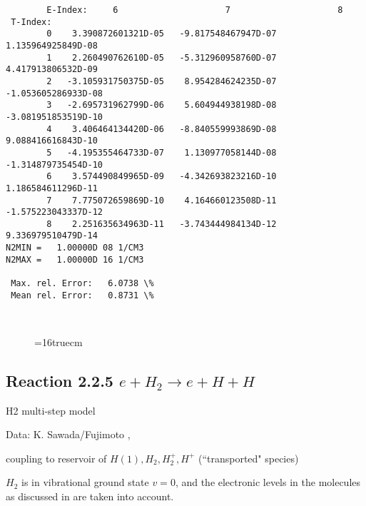 \documentclass[12pt,dvipdfmx]{article}
\begin{document}
\begin{small}
\begin{verbatim}
        E-Index:     6                     7                     8
 T-Index:
        0    3.390872601321D-05   -9.817548467947D-07    1.135964925849D-08
        1    2.260490762610D-05   -5.312960958760D-07    4.417913806532D-09
        2   -3.105931750375D-05    8.954284624235D-07   -1.053605286933D-08
        3   -2.695731962799D-06    5.604944938198D-08   -3.081951853519D-10
        4    3.406464134420D-06   -8.840559993869D-08    9.088416616843D-10
        5   -4.195355464733D-07    1.130977058144D-08   -1.314879735454D-10
        6    3.574490849965D-09   -4.342693823216D-10    1.186584611296D-11
        7    7.775072659869D-10    4.164660123508D-11   -1.575223043337D-12
        8    2.251635634963D-11   -3.743444984134D-12    9.336979510479D-14
N2MIN =   1.00000D 08 1/CM3
N2MAX =   1.00000D 16 1/CM3

 Max. rel. Error:   6.0738 \%
 Mean rel. Error:   0.8731 \%



\end{verbatim}\end{small}
\begin{figure} \label{2.1.8b}
\epsfxsize=16truecm
\end{figure}
\newpage


\subsection{
Reaction 2.2.5    $e + H_2   \rightarrow e + H + H  $
}

H2 multi-step model

 Data: K. Sawada/Fujimoto ,\cite{kn:Sawada}

coupling to reservoir of $  H(1), H_2, H_2^+, H^+ $ (``transported" species)


$H_2$ is in vibrational ground state $v=0$, and the electronic levels
in the molecules as discussed in \cite{kn:Sawada} are taken into
account.
\end{document}

